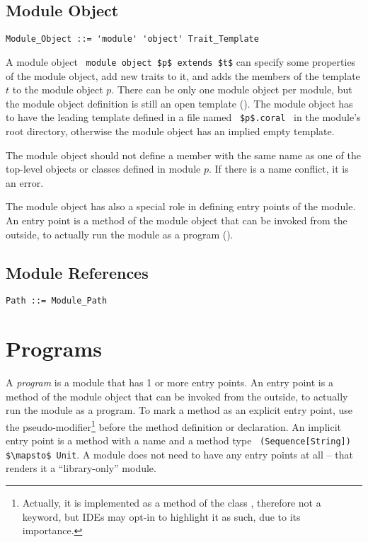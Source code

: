 \subsection{Module Object}

\syntax\begin{lstlisting}
Module_Object ::= 'module' 'object' Trait_Template
\end{lstlisting}

A module object ~\lstinline!module object $p$ extends $t$! can specify some properties of the module object, add new traits to it, and adds the members of the template $t$ to the module object $p$. There can be only one module object per module, but the module object definition is still an open template (). The module object has to have the leading template defined in a file named ~\lstinline!$p$.coral!~ in the module's root directory, otherwise the module object has an implied empty template. 

The module object should not define a member with the same name as one of the top-level objects or classes defined in module $p$. If there is a name conflict, it is an error. 

The module object has also a special role in defining entry points of the module. An entry point is a method of the module object that can be invoked from the outside, to actually run the module as a program (). 






\subsection{Module References}
\label{sec:module-refs}

\syntax\begin{lstlisting}
Path ::= Module_Path
\end{lstlisting}





\section{Programs}
\label{sec:programs}

A {\em program} is a module that has 1 or more entry points. An entry point is a method of the module object that can be invoked from the outside, to actually run the module as a program. To mark a method as an explicit entry point, use the  pseudo-modifier\footnote{Actually, it is implemented as a method of the class , therefore not a keyword, but IDEs may opt-in to highlight it as such, due to its importance.} before the method definition or declaration. An implicit entry point is a method with a name  and a method type ~\lstinline!(Sequence[String]) $\mapsto$ Unit!. A module does not need to have any entry points at all -- that renders it a ``library-only'' module. 

